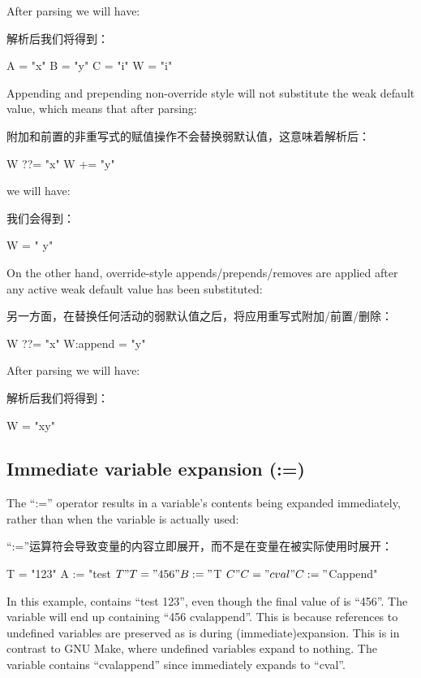After parsing we will have:

解析后我们将得到：

\begin{pyglist}
A = "x"
B = "y"
C = "i"
W = "i"
\end{pyglist}

Appending and prepending non-override style will not substitute the weak default value, which means that after parsing:

附加和前置的非重写式的赋值操作不会替换弱默认值，这意味着解析后：

\begin{pyglist}
W ??= "x"
W += "y"
\end{pyglist}

we will have:

我们会得到：

\begin{pyglist}
W = " y"
\end{pyglist}

On the other hand, override-style appends/prepends/removes are applied after any active weak default value has been substituted:

另一方面，在替换任何活动的弱默认值之后，将应用重写式附加/前置/删除：

\begin{pyglist}
W ??= "x"
W:append = "y"
\end{pyglist}

After parsing we will have:

解析后我们将得到：


\begin{pyglist}
W = "xy"
\end{pyglist}

\subsection{Immediate variable expansion (:=)}
\label{section:Immediate variable expansion (:=)}

The ``:='' operator results in a variable's contents being expanded immediately, rather than when the variable is actually used:

``:=''运算符会导致变量的内容立即展开，而不是在变量在被实际使用时展开：

\begin{pyglist}
T = "123"
A := "test ${T}"
T = "456"
B := "${T} ${C}"
C = "cval"
C := "${C}append"
\end{pyglist}

In this example,  contains ``test 123'', even though the final value of  is ``456''. The variable  will end up containing ``456 cvalappend''. This is because references to undefined variables are preserved as is during (immediate)expansion. This is in contrast to GNU Make, where undefined variables expand to nothing. The variable  contains ``cvalappend'' since  immediately expands to ``cval''.

